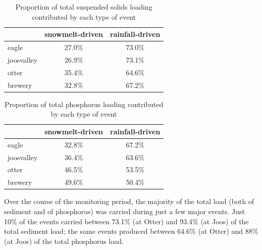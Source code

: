 \documentclass[12pt]{article}
\begin{document}
\begin{table}[ht]
\begin{center}
\begin{tabular}{lcc}
  & snowmelt-driven & rainfall-driven \\ 
  \hline
eagle & 27.0\% & 73.0\% \\ 
  joosvalley & 26.9\% & 73.1\% \\ 
  otter & 35.4\% & 64.6\% \\ 
  brewery & 32.8\% & 67.2\% \\ 
  \end{tabular}
\caption{Proportion of total suspended solids loading contributed by each type of event}
\label{tab:stot}
\end{center}
\end{table}
\begin{table}[ht]
\begin{center}
\begin{tabular}{lcc}
  & snowmelt-driven & rainfall-driven \\ 
  \hline
eagle & 32.8\% & 67.2\% \\ 
  joosvalley & 36.4\% & 63.6\% \\ 
  otter & 46.5\% & 53.5\% \\ 
  brewery & 49.6\% & 50.4\% \\ 
  \end{tabular}
\caption{Proportion of total phosphorus loading contributed by each type of event}
\label{tab:ptot}
\end{center}
\end{table}
Over the course of the monitoring period, the majority of the total load (both of sediment and of phosphorus) was carried during just a few major events. Just 10\% of the events carried between 73.1\% (at Otter) and 93.4\% (at Joos) of the total sediment load; the same events produced between 64.6\% (at Otter) and 88\% (at Joos) of the total phosphorus load.\\


        
\end{document}
